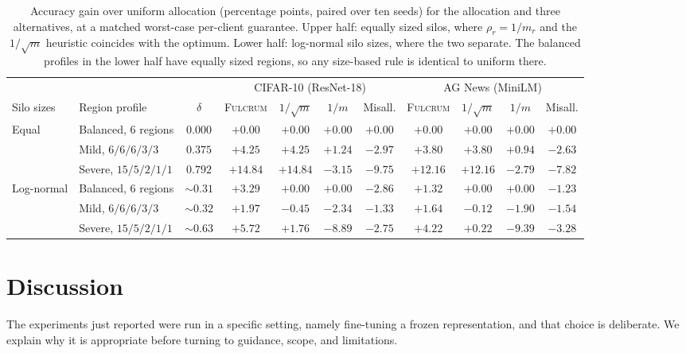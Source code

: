 \documentclass[acmsmall,screen,review,anonymous]{acmart}
\theoremstyle{acmdefinition}%
\newcommand{\Fulcrum}{\textsc{Fulcrum}\xspace}
\begin{document}
\begin{table}[t]
\caption{Accuracy gain over uniform allocation (percentage points, paired over ten seeds) for the allocation and three alternatives, at a matched worst-case per-client guarantee. Upper half: equally sized silos, where $\rho_r = 1/m_r$ and the $1/\sqrt{m}$ heuristic coincides with the optimum. Lower half: log-normal silo sizes, where the two separate. The balanced profiles in the lower half have equally sized regions, so any size-based rule is identical to uniform there.}
\label{tab:baselines}
\centering
\footnotesize
\setlength{\tabcolsep}{2.6pt}
\begin{tabular}{@{}llc cccc cccc@{}}
\toprule
& & & \multicolumn{4}{c}{CIFAR-10 (ResNet-18)} & \multicolumn{4}{c}{AG News (MiniLM)} \\
\cmidrule(lr){4-7}\cmidrule(lr){8-11}
Silo sizes & Region profile & $\delta$
& \Fulcrum & $1/\sqrt{m}$ & $1/m$ & Misall.
& \Fulcrum & $1/\sqrt{m}$ & $1/m$ & Misall. \\
\midrule
\multirow{3}{*}{Equal}
 & Balanced, 6 regions & $0.000$ & $+0.00$ & $+0.00$ & $+0.00$ & $+0.00$ & $+0.00$ & $+0.00$ & $+0.00$ & $+0.00$ \\
 & Mild, $6/6/6/3/3$   & $0.375$ & $+4.25$ & $+4.25$ & $+1.24$ & $-2.97$ & $+3.80$ & $+3.80$ & $+0.94$ & $-2.63$ \\
 & Severe, $15/5/2/1/1$& $0.792$ & $\mathbf{+14.84}$ & $\mathbf{+14.84}$ & $-3.15$ & $-9.75$ & $\mathbf{+12.16}$ & $\mathbf{+12.16}$ & $-2.79$ & $-7.82$ \\
\midrule
\multirow{3}{*}{Log-normal}
 & Balanced, 6 regions & $\sim\!0.31$ & $\mathbf{+3.29}$ & $+0.00$ & $+0.00$ & $-2.86$ & $\mathbf{+1.32}$ & $+0.00$ & $+0.00$ & $-1.23$ \\
 & Mild, $6/6/6/3/3$   & $\sim\!0.32$ & $\mathbf{+1.97}$ & $-0.45$ & $-2.34$ & $-1.33$ & $\mathbf{+1.64}$ & $-0.12$ & $-1.90$ & $-1.54$ \\
 & Severe, $15/5/2/1/1$& $\sim\!0.63$ & $\mathbf{+5.72}$ & $+1.76$ & $-8.89$ & $-2.75$ & $\mathbf{+4.22}$ & $+0.22$ & $-9.39$ & $-3.28$ \\
\bottomrule
\end{tabular}
\end{table}

\section{Discussion}
\label{sec:discussion}

The experiments just reported were run in a specific setting, namely fine-tuning
a frozen representation, and that choice is deliberate. We explain why it is
appropriate before turning to guidance, scope, and limitations.
\end{document}

